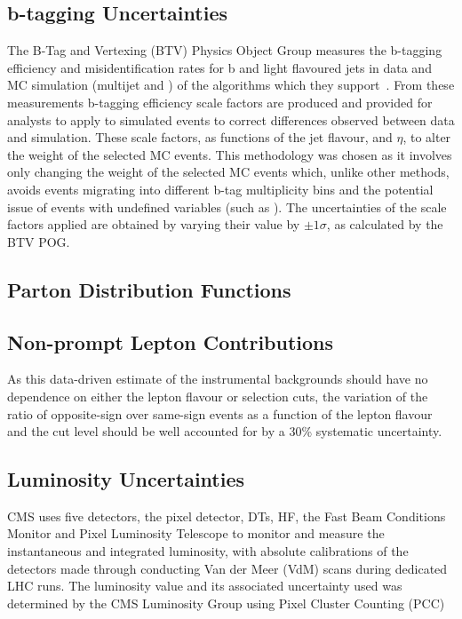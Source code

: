 \subsection{b-tagging Uncertainties}
The B-Tag and Vertexing (BTV) Physics Object Group measures the b-tagging efficiency and misidentification rates for b and light flavoured jets in data and MC simulation (multijet and \ttbar) of the algorithms which they support~\cite{Sirunyan:2017ezt}.
From these measurements b-tagging efficiency scale factors are produced and provided for analysts to apply to simulated events to correct differences observed between data and simulation.
These scale factors, as functions of the jet flavour, \pT and $\eta$, to alter the weight of the selected MC events.
This methodology was chosen as it involves only changing the weight of the selected MC events which, unlike other methods, avoids events migrating into different b-tag multiplicity bins and the potential issue of events with undefined variables (such as ).
The uncertainties of the scale factors applied are obtained by varying their value by $\pm 1\sigma$, as calculated by the BTV POG. 

\subsection{Parton Distribution Functions}
\subsection{Non-prompt Lepton Contributions}
As this data-driven estimate of the instrumental backgrounds should have no dependence on either the lepton flavour or selection cuts, the variation of the ratio of opposite-sign over same-sign events as a function of the lepton flavour and the cut level should be well accounted for by a 30\% systematic uncertainty.

\subsection{Luminosity Uncertainties}
CMS uses five detectors, the pixel detector, DTs, HF, the Fast Beam Conditions Monitor and Pixel Luminosity Telescope to monitor and measure the instantaneous and integrated luminosity, with absolute calibrations of the detectors made through conducting Van der Meer (VdM) scans during dedicated LHC runs.
The luminosity value and its associated uncertainty used was determined by the CMS Luminosity Group using 
Pixel Cluster Counting (PCC) 

